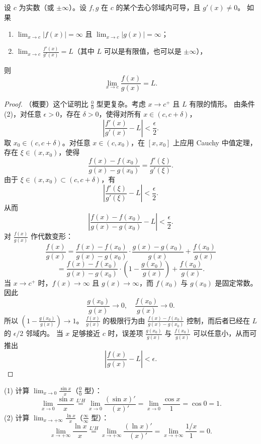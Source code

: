 \begin{theorem}
\label{thm:lhopital_inf_cn}
设 $c$ 为实数（或 $\pm\infty$）。设 $f,g$ 在 $c$ 的某个去心邻域内可导，且 $g'(x)\ne 0$。
如果
\begin{enumerate}
    \item $\lim_{x\to c}|f(x)|=\infty$ 且 $\lim_{x\to c}|g(x)|=\infty$；
    \item $\lim_{x\to c}\frac{f'(x)}{g'(x)}=L$（其中 $L$ 可以是有限值，也可以是 $\pm\infty$），
\end{enumerate}
则
\[
\lim_{x\to c}\frac{f(x)}{g(x)}=L.
\]
\end{theorem}

\begin{proof}
（概要）这个证明比 $\frac{0}{0}$ 型更复杂。考虑 $x\to c^+$ 且 $L$ 有限的情形。
由条件 (2)，对任意 $\epsilon>0$，存在 $\delta>0$，使得对所有 $x\in(c,c+\delta)$，
\[
\left|\frac{f'(x)}{g'(x)}-L\right|<\frac{\epsilon}{2}.
\]
取 $x_0\in(c,c+\delta)$。对任意 $x\in(c,x_0)$，在 $[x,x_0]$ 上应用 Cauchy 中值定理，存在 $\xi\in(x,x_0)$，使得
\[
\frac{f(x)-f(x_0)}{g(x)-g(x_0)}=\frac{f'(\xi)}{g'(\xi)}.
\]
由于 $\xi\in(x,x_0)\subset(c,c+\delta)$，有
\[
\left|\frac{f'(\xi)}{g'(\xi)}-L\right|<\frac{\epsilon}{2}.
\]
从而
\[
\left|\frac{f(x)-f(x_0)}{g(x)-g(x_0)}-L\right|<\frac{\epsilon}{2}.
\]
对 $\frac{f(x)}{g(x)}$ 作代数变形：
\[
\frac{f(x)}{g(x)}=\frac{f(x)-f(x_0)}{g(x)-g(x_0)}\cdot \frac{g(x)-g(x_0)}{g(x)}+\frac{f(x_0)}{g(x)}
\]
\[
=\frac{f(x)-f(x_0)}{g(x)-g(x_0)}\cdot \left(1-\frac{g(x_0)}{g(x)}\right)+\frac{f(x_0)}{g(x)}.
\]
当 $x\to c^+$ 时，$f(x)\to\infty$ 且 $g(x)\to\infty$，而 $f(x_0)$ 与 $g(x_0)$ 是固定常数。因此
\[
\frac{g(x_0)}{g(x)}\to 0,\quad \frac{f(x_0)}{g(x)}\to 0.
\]
所以 $\left(1-\frac{g(x_0)}{g(x)}\right)\to 1$。
$\frac{f(x)}{g(x)}$ 的极限行为由 $\frac{f(x)-f(x_0)}{g(x)-g(x_0)}$ 控制，而后者已经在 $L$ 的 $\epsilon/2$ 邻域内。
当 $x$ 足够接近 $c$ 时，误差项 $\frac{g(x_0)}{g(x)}$ 与 $\frac{f(x_0)}{g(x)}$ 可以任意小，从而可推出
\[
\left|\frac{f(x)}{g(x)}-L\right|<\epsilon.
\]
\end{proof}

\begin{example}
(1) 计算 $\lim_{x\to 0}\frac{\sin x}{x}$（$\frac{0}{0}$ 型）：
\[
\lim_{x\to 0}\frac{\sin x}{x}\overset{L'H}{=}\lim_{x\to 0}\frac{(\sin x)'}{(x)'}=\lim_{x\to 0}\frac{\cos x}{1}=\cos0=1.
\]
(2) 计算 $\lim_{x\to +\infty}\frac{\ln x}{x}$（$\frac{\infty}{\infty}$ 型）：
\[
\lim_{x\to +\infty}\frac{\ln x}{x}\overset{L'H}{=}\lim_{x\to +\infty}\frac{(\ln x)'}{(x)'}=\lim_{x\to +\infty}\frac{1/x}{1}=0.
\]
\end{example}


